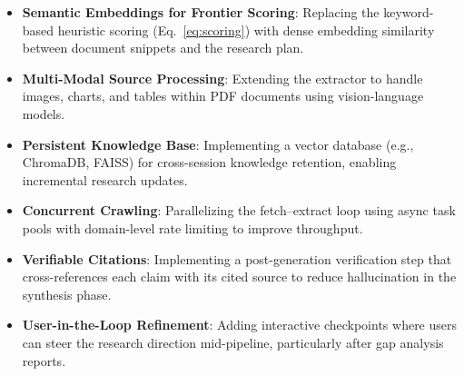 \documentclass[conference]{IEEEtran}
\begin{document}
\begin{itemize}
    \item \textbf{Semantic Embeddings for Frontier Scoring}: Replacing the keyword-based heuristic scoring (Eq.~\ref{eq:scoring}) with dense embedding similarity between document snippets and the research plan.
    \item \textbf{Multi-Modal Source Processing}: Extending the extractor to handle images, charts, and tables within PDF documents using vision-language models.
    \item \textbf{Persistent Knowledge Base}: Implementing a vector database (e.g., ChromaDB, FAISS) for cross-session knowledge retention, enabling incremental research updates.
    \item \textbf{Concurrent Crawling}: Parallelizing the fetch--extract loop using async task pools with domain-level rate limiting to improve throughput.
    \item \textbf{Verifiable Citations}: Implementing a post-generation verification step that cross-references each claim with its cited source to reduce hallucination in the synthesis phase.
    \item \textbf{User-in-the-Loop Refinement}: Adding interactive checkpoints where users can steer the research direction mid-pipeline, particularly after gap analysis reports.
\end{itemize}
\end{document}
